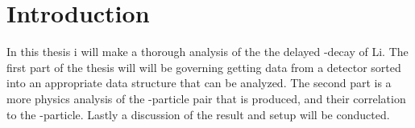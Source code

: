 \chapter{Introduction}
In this thesis i will make a thorough analysis of the the delayed \be-decay of \isotope[8]Li. The first part of the thesis will will be governing getting data from a detector sorted into an appropriate data structure that can be analyzed. 
The second part is a more physics analysis of the \al-particle pair that is produced, and their correlation to the \be-particle.
Lastly a discussion of the result and setup will be conducted. 